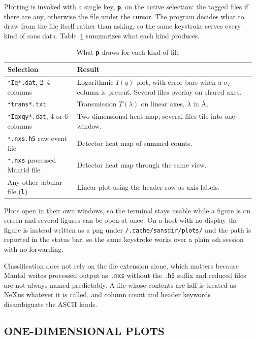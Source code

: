 \documentclass[tm]{ornltm}
\newcommand{\key}[1]{\textbf{\texttt{#1}}}
\newcommand{\hme}{\raisebox{0.4ex}{\texttildelow}}
\begin{document}
Plotting is invoked with a single key, \key{p}, on the active selection: the
tagged files if there are any, otherwise the file under the cursor. The program
decides what to draw from the file itself rather than asking, so the same
keystroke serves every kind of \ac{sans} data. Table~\ref{tab:plotrouting}
summarizes what each kind produces.

\begin{table}[ht]
  \centering
  \caption{What \key{p} draws for each kind of file}
  \label{tab:plotrouting}
  \small
  \begin{tabular}{p{} p{}}
    \toprule
    Selection & Result \\
    \midrule
    \texttt{*Iq*.dat}, 2--4 columns & Logarithmic $I(q)$ plot, with error bars
      when a $\sigma_I$ column is present. Several files overlay on shared
      axes. \\
    \texttt{*trans*.txt} & Transmission $T(\lambda)$ on linear axes,
      $\lambda$ in \AA. \\
    \texttt{*Iqxqy*.dat}, 4 or 6 columns & Two-dimensional heat map; several
      files tile into one window. \\
    \texttt{*.nxs.h5} raw event file & Detector heat map of summed counts. \\
    \texttt{*.nxs} processed Mantid file & Detector heat map through the same
      view. \\
    Any other tabular file (\key{l}) & Linear plot using the header row as axis
      labels. \\
    \bottomrule
  \end{tabular}
\end{table}

Plots open in their own windows, so the terminal stays usable while a figure is
on screen and several figures can be open at once. On a host with no display
the figure is instead written as a \ac{png} under
\texttt{\hme/.cache/sansdir/plots/} and the path is reported in the status bar,
so the same keystroke works over a plain \ac{ssh} session with no forwarding.

Classification does not rely on the file extension alone, which matters because
Mantid writes processed output as \texttt{.nxs} without the \texttt{.h5} suffix
and reduced files are not always named predictably. A file whose contents are
\ac{hdf} is treated as NeXus whatever it is called, and column count and header
keywords disambiguate the ASCII kinds.

\subsection{ONE-DIMENSIONAL PLOTS}
\end{document}
